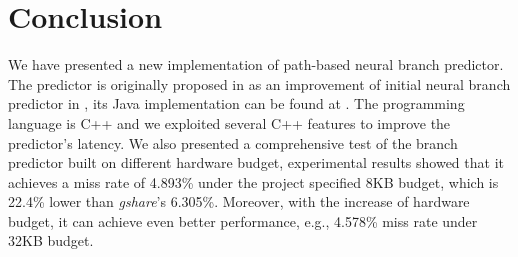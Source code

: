 \documentclass[conference]{IEEEtran}
\begin{document}




\section{Conclusion}
We have presented a new implementation of path-based neural branch predictor. The predictor is originally proposed in \cite{jimenez2003fast} as an improvement of initial neural branch predictor in \cite{jimenez2001dynamic}, its Java implementation can be found at \cite{javapathpre}. The programming language is C++ and we exploited several C++ features to improve the predictor's latency. We also presented a comprehensive test of the branch predictor built on different hardware budget, experimental results showed that it achieves a miss rate of  4.893\% under the project specified 8KB budget, which is 22.4\% lower than \emph{gshare}'s 6.305\%. Moreover, with the increase of hardware budget, it can achieve even better performance, e.g., 4.578\% miss rate under 32KB budget.













%
%
%






\end{document}
